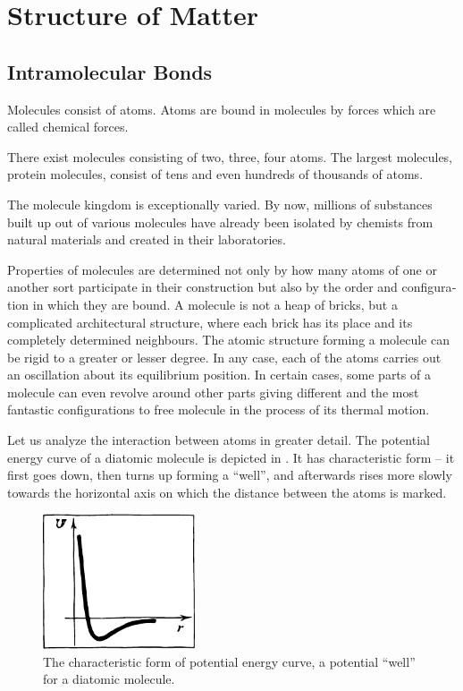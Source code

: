 

\cleardoublepage
\chapter{Structure of Matter}
\label{ch-02}

\section{Intramolecular Bonds}
Molecules consist of atoms. Atoms are bound in mol­ecules by forces which are called chemical forces.

There exist molecules consisting of two, three, four atoms. The largest molecules, protein molecules, consist of tens and even hundreds of thousands of atoms.

The molecule kingdom is exceptionally varied. By now, millions of substances built up out of various molecules have already been isolated by chemists from natural materials and created in their laboratories.

Properties of molecules are determined not only by how many atoms of one or another sort participate in their construction but also by the order and configura­tion in which they are bound. A molecule is not a heap of bricks, but a complicated architectural structure, where each brick has its place and its completely de­termined neighbours. The atomic structure forming a molecule can be rigid to a greater or lesser degree. In any case, each of the atoms carries out an oscillation about its equilibrium position. In certain cases, some parts of a molecule can even revolve around other parts giving different and the most fantastic configurations to free molecule in the process of its thermal motion.

Let us analyze the interaction between atoms in greater detail. The potential energy curve of a diatomic mole­cule is depicted in . It has characteristic form -- it first goes down, then turns up forming a ``well'', and afterwards rises more slowly towards the horizontal axis on which the distance between the atoms is marked.

\begin{figure}[!ht]
\centering
\includegraphics[width=0.4\textwidth]{figures/fig-02-01.pdf}
\caption{The characteristic form of potential energy curve, a potential ``well'' for a diatomic molecule.}
\label{fig-2.1}
\end{figure}

